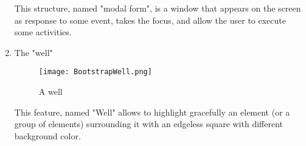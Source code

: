 \begin{enumerate}
This structure, named "modal form", is a window that appears on the screen as response to some event, takes the focus, and allow the user to execute some activities. 

\item The "well"

\begin{figure}[H]
\centering
\texttt{[image: BootstrapWell.png]} 
\caption{A well}
\end{figure}

This feature, named "Well" allows to highlight gracefully an element (or a group of elements) surrounding it with an edgeless square with different background color. 

\end{enumerate}
